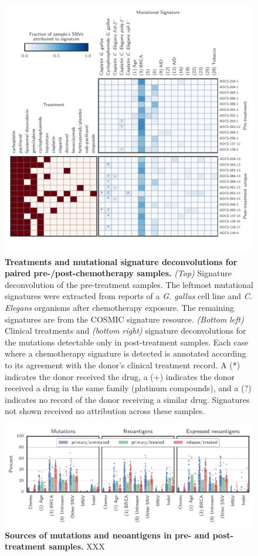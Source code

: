 \begin{figure}[htbp]
\centering
\includegraphics[scale=1.0]{figures/signatures.pdf}
\caption{\textbf{Treatments and mutational signature deconvolutions for paired pre-/post-chemotherapy samples.} \textit{(Top)} Signature deconvolution of the pre-treatment samples. The leftmost mutational signatures were extracted from reports of a \textit{G. gallus}\cite{Szikriszt_2016} cell line and \textit{C. Elegans}\cite{Meier_2014} organisms after chemotherapy exposure. The remaining signatures are from the COSMIC signature resource\cite{364242}. \textit{(Bottom left)} Clinical treatments and \textit{(bottom right)} signature deconvolutions for the mutations detectable only in post-treatment samples. Each case where a chemotherapy signature is detected is annotated according to its agreement with the donor's clinical treatment record. A (*) indicates the donor received the drug, a (+) indicates the donor received a drug in the same family (platinum compounds), and a (?) indicates no record of the donor receiving a similar drug. Signatures not shown received no attribution across these samples.}
\label{fig:signatures}
\end{figure}

\begin{figure}[htbp]
\centering
\includegraphics[scale=1.0]{figures/sources_of_mutations_and_neoantigens.pdf}
\caption{\textbf{Sources of mutations and neoantigens in pre- and post-treatment samples.}  XXX}
\label{fig:sources}
\end{figure}


